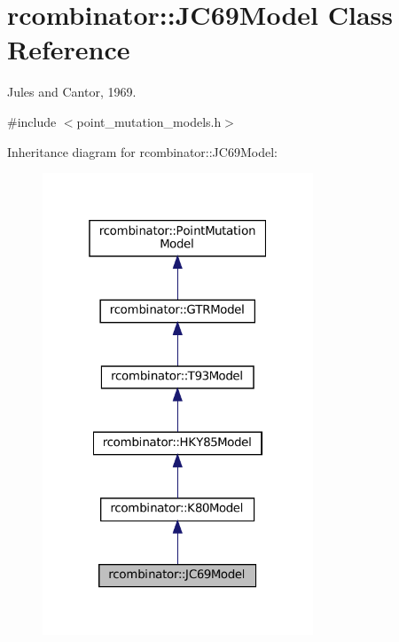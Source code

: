\hypertarget{classrcombinator_1_1JC69Model}{}\section{rcombinator\+:\+:J\+C69\+Model Class Reference}
\label{classrcombinator_1_1JC69Model}


Jules and Cantor, 1969.  




{\ttfamily \#include $<$point\+\_\+mutation\+\_\+models.\+h$>$}



Inheritance diagram for rcombinator\+:\+:J\+C69\+Model\+:\nopagebreak
\begin{figure}[H]
\begin{center}
\leavevmode
\includegraphics[width=229pt]{classrcombinator_1_1JC69Model__inherit__graph}
\end{center}
\end{figure}


